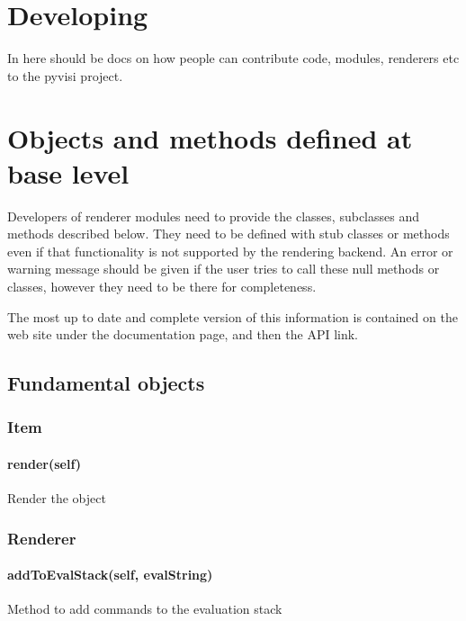 
\chapter{Developing \pyvisi}
\label{chap:developingPyvisi}

In here should be docs on how people can contribute code, modules, renderers
etc to the pyvisi project.


\chapter{Objects and methods defined at base level}

Developers of \pyvisi renderer modules need to provide the classes, subclasses
and methods described below.  They need to be defined with stub classes or
methods even if that functionality is not supported by the rendering backend.
An error or warning message should be given if the user tries to call these
null methods or classes, however they need to be there for completeness.

The most up to date and complete version of this information is contained on
the \pyvisi web site under the documentation page, and then the API link.

\section{Fundamental objects}

\subsection{Item}

\subsubsection{render(self)}

Render the object

\subsection{Renderer}

\subsubsection{addToEvalStack(self, evalString)}

Method to add commands to the evaluation stack

